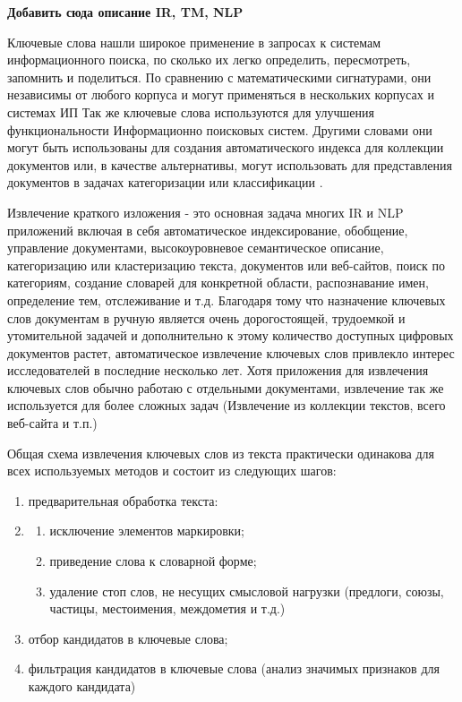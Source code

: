 \textbf{Добавить сюда описание IR, TM, NLP}

Ключевые слова нашли широкое применение в запросах к системам информационного поиска, по сколько их легко определить, пересмотреть, запомнить и поделиться.
По сравнению с математическими сигнатурами, они независимы от любого корпуса и могут применяться в нескольких корпусах и системах ИП \cite{5}
Так же ключевые слова используются для улучшения функциональности Информационно поисковых систем.
Другими словами они могут быть использованы для создания автоматического индекса для коллекции документов или, в качестве альтернативы, могут использовать для представления документов в задачах категоризации или классификации \cite{1}.

Извлечение краткого изложения - это основная задача многих IR и NLP приложений включая в себя автоматическое индексирование, обобщение, управление документами, высокоуровневое семантическое описание, категоризацию или кластеризацию текста, документов или веб-сайтов, поиск по категориям, создание словарей для конкретной области, распознавание имен, определение тем, отслеживание и т.д.
Благодаря тому что назначение ключевых слов документам в ручную является очень дорогостоящей, трудоемкой и утомительной задачей и дополнительно к этому количество доступных цифровых документов растет, автоматическое извлечение ключевых слов привлекло интерес исследователей в последние несколько лет.
Хотя приложения для извлечения ключевых слов обычно работаю с отдельными документами, извлечение так же используется для более сложных задач (Извлечение из коллекции текстов, всего веб-сайта и т.п.)

Общая схема извлечения ключевых слов из текста практически одинакова для всех используемых методов и состоит из следующих шагов:
\begin{enumerate}
	\item предварительная обработка текста:
	\item \begin{enumerate}
		\item исключение элементов маркировки;
		\item приведение слова к словарной форме;
		\item удаление стоп слов, не несущих смысловой нагрузки (предлоги, союзы, частицы, местоимения, междометия и т.д.)
	\end{enumerate}
	\item отбор кандидатов в ключевые слова;
	\item фильтрация кандидатов в ключевые слова (анализ значимых признаков для каждого кандидата)
\end{enumerate}

